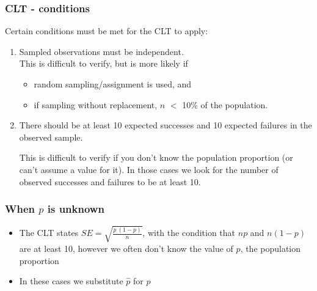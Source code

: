 \documentclass[t,compress,mathserif]{beamer}
\begin{document}

\begin{frame}
\frametitle{CLT - conditions}

Certain conditions must be met for the CLT to apply:

\begin{enumerate}

\item {} Sampled observations must be independent. \\

This is difficult to verify, but is more likely if
\begin{itemize}
\item random sampling/assignment is used, and
\item if sampling without replacement, $n$ $<$ 10\% of the population.
\end{itemize}

\pause

\item {} There should be at least 10 expected successes and 10 expected failures in the observed sample.

This is difficult to verify if you don't know the population proportion (or can't assume a value for it). In those cases we look for the number of observed successes and failures to be at least 10.

\end{enumerate}

\end{frame}


\begin{frame}
\frametitle{When $p$ is unknown}

\begin{itemize}

\item The CLT states $SE = \sqrt{\frac{p~(1-p)}{n}}$, with the condition that $np$ and $n(1-p)$ are at least 10, however we often don't know the value of $p$, the population proportion

\item In these cases we substitute $\hat{p}$ for $p$

\end{itemize}

\end{frame}

\end{document}
